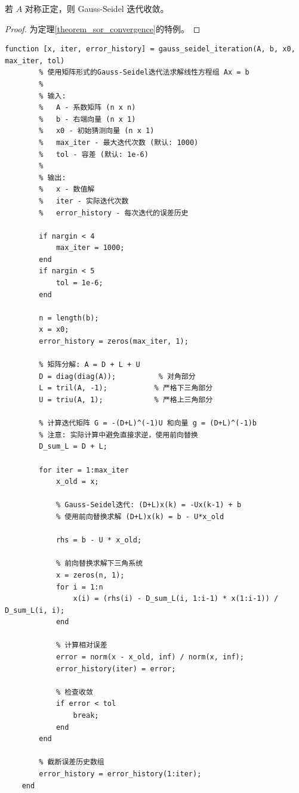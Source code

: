 \begin{theorem}
    若 $A$ 对称正定，则 Gauss-Seidel 迭代收敛。
\begin{proof}
为定理\;\ref{theorem_sor_convergence}的特例。
\end{proof}
\end{theorem}

\begin{lstlisting}[caption={gauss\_seidel\_iteration.m}]
    function [x, iter, error_history] = gauss_seidel_iteration(A, b, x0, max_iter, tol)
        % 使用矩阵形式的Gauss-Seidel迭代法求解线性方程组 Ax = b
        %
        % 输入:
        %   A - 系数矩阵 (n x n)
        %   b - 右端向量 (n x 1)
        %   x0 - 初始猜测向量 (n x 1)
        %   max_iter - 最大迭代次数 (默认: 1000)
        %   tol - 容差 (默认: 1e-6)
        %
        % 输出:
        %   x - 数值解
        %   iter - 实际迭代次数
        %   error_history - 每次迭代的误差历史

        if nargin < 4
            max_iter = 1000;
        end
        if nargin < 5
            tol = 1e-6;
        end
        
        n = length(b);
        x = x0;
        error_history = zeros(max_iter, 1);
        
        % 矩阵分解: A = D + L + U
        D = diag(diag(A));          % 对角部分
        L = tril(A, -1);           % 严格下三角部分
        U = triu(A, 1);            % 严格上三角部分
        
        % 计算迭代矩阵 G = -(D+L)^(-1)U 和向量 g = (D+L)^(-1)b
        % 注意: 实际计算中避免直接求逆，使用前向替换
        D_sum_L = D + L;
        
        for iter = 1:max_iter
            x_old = x;
            
            % Gauss-Seidel迭代: (D+L)x(k) = -Ux(k-1) + b
            % 使用前向替换求解 (D+L)x(k) = b - U*x_old
            
            rhs = b - U * x_old;
            
            % 前向替换求解下三角系统
            x = zeros(n, 1);
            for i = 1:n
                x(i) = (rhs(i) - D_sum_L(i, 1:i-1) * x(1:i-1)) / D_sum_L(i, i);
            end
            
            % 计算相对误差
            error = norm(x - x_old, inf) / norm(x, inf);
            error_history(iter) = error;
            
            % 检查收敛
            if error < tol
                break;
            end
        end
        
        % 截断误差历史数组
        error_history = error_history(1:iter);
    end
\end{lstlisting}


